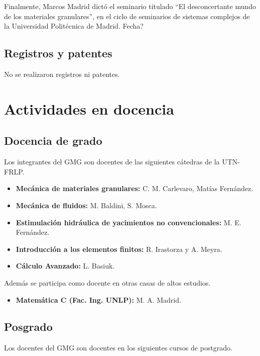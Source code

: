 \documentclass[a4paper,11pt,twoside,final,titlepage,onecolumn,openright]{report}
\begin{document}
Finalmente, Marcos Madrid dictó el seminario titulado ``El desconcertante mundo de los materiales granulares'', en el ciclo de seminarios de sistemas complejos de la Universidad Politécnica de Madrid. {\color{red}Fecha?}

\section{Registros y patentes}

No se realizaron registros ni patentes.



\chapter{Actividades en docencia}

\section{Docencia de grado}

Los integrantes del GMG son docentes de las siguientes cátedras de la UTN-FRLP.

\begin{itemize}
 \item {\bf Mecánica de materiales granulares:} C. M. Carlevaro, Matías Fernández.
 \item {\bf Mecánica de fluidos:} M. Baldini, S. Mosca.
 \item {\bf Estimulación hidráulica de yacimientos no convencionales:} M. E. Fernández.
 \item {\bf Introducción a los elementos finitos:} R. Irastorza y A. Meyra.
 \item {\bf Cálculo Avanzado:} L. Basiuk.
\end{itemize}

Además se participa como docente en otras casas de altos estudios.

\begin{itemize}
 \item {\bf Matemática C (Fac. Ing. UNLP):} M. A. Madrid.
\end{itemize}


\section{Posgrado}

Los docentes del GMG son docentes en los siguientes cursos de postgrado.
\end{document}
